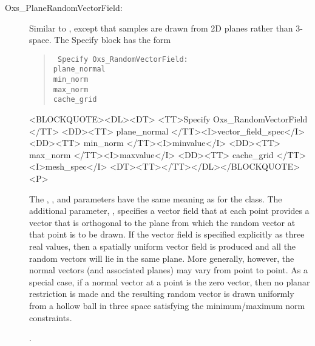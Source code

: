 \begin{description}
\item[Oxs\_PlaneRandomVectorField:]
%
   Similar to , except that samples are
   drawn from 2D planes rather than 3-space.  The Specify block has the
   form
      \begin{latexonly}
      \begin{quote}\tt
      Specify Oxs\_RandomVectorField: \ocb\\
       \bi plane\_normal \\
       \bi min\_norm \\
       \bi max\_norm \\
       \bi cache\_grid \\
      \ccb
      \end{quote}
      \end{latexonly}
      \begin{rawhtml}
      <BLOCKQUOTE><DL><DT>
      <TT>Specify Oxs_RandomVectorField {</TT>
      <DD><TT> plane_normal </TT><I>vector_field_spec</I>
      <DD><TT> min_norm </TT><I>minvalue</I>
      <DD><TT> max_norm </TT><I>maxvalue</I>
      <DD><TT> cache_grid </TT><I>mesh_spec</I>
      <DT><TT>}</TT></DL></BLOCKQUOTE><P>
      \end{rawhtml}
  The , , and
   parameters have the same meaning as for the
   class.  The additional parameter,
  , specifies a vector field that at each point
  provides a vector that is orthogonal to the plane from which the
  random vector at that point is to be drawn.  If the vector field is
  specified explicitly as three real values, then a spatially uniform
  vector field is produced and all the random vectors will lie in the
  same plane.  More generally, however, the normal vectors (and
  associated planes) may vary from point to point.  As a special case,
  if a normal vector at a point is the zero vector, then no planar
  restriction is made and the resulting random vector is drawn uniformly
  from a hollow ball in three space satisfying the minimum/maximum norm
  constraints.

\begin{ExampleMifs}[Example]
  .
\end{ExampleMifs}


\end{description}
